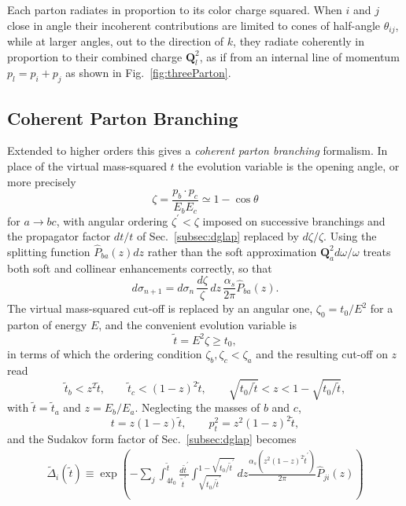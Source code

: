 Each parton radiates in proportion to its color charge squared. When \(i\) and \(j\) close in angle their incoherent
contributions are limited to cones of half-angle \(\theta_{ij}\), while at larger
angles, out to the direction of \(k\), they radiate coherently in proportion to
their combined charge \(\mathbf{Q}_l^2\), as if from an internal line of momentum
\(p_l = p_i+p_j\) as shown in Fig.~\ref{fig:threeParton}.

\subsection{Coherent Parton Branching}
\label{sec:coherentPartonBranching}
Extended to higher orders this gives a \emph{coherent parton branching} formalism.
In place of the virtual mass-squared \(t\) the evolution variable is the opening
angle, or more precisely
\begin{equation}
	\zeta = \frac{p_b\cdot p_c}{E_bE_c} \simeq 1-\cos\theta
	\label{eq:zeta}
\end{equation}
for \(a\to bc\), with angular ordering \(\zeta^\prime<\zeta\) imposed on successive
branchings and the propagator factor \(dt/t\) of Sec.~\ref{subsec:dglap} replaced by
\(d\zeta/\zeta\). Using the splitting function \(\hat{P}_{ba}(z)dz\) rather than the
soft approximation \(\mathbf{Q}_a^2d\omega/\omega\) treats both soft and collinear
enhancements correctly, so that
\begin{equation}
	d\sigma_{n+1} = d\sigma_n\,\frac{d\zeta}{\zeta}\,dz\,
	\frac{\alpha_s}{2\pi}\hat{P}_{ba}(z).
	\label{eq:coherentBranching}
\end{equation}
The virtual mass-squared cut-off is replaced by an angular one,
\(\zeta_0 = t_0/E^2\) for a parton of energy \(E\), and the convenient evolution
variable is
\begin{equation}
	\tilde{t} = E^2\zeta \geq t_0 ,
	\label{eq:tildeT}
\end{equation}
in terms of which the ordering condition \(\zeta_b,\zeta_c<\zeta_a\) and the
resulting cut-off on \(z\) read
\begin{equation}
	\tilde{t}_b < z^2\tilde{t},
	\qquad
	\tilde{t}_c < (1-z)^2\tilde{t},
	\qquad
	\sqrt{t_0/\tilde{t}} < z < 1-\sqrt{t_0/\tilde{t}} ,
	\label{eq:orderingCutoff}
\end{equation}
with \(\tilde{t}=\tilde{t}_a\) and \(z=E_b/E_a\). Neglecting the masses of \(b\) and
\(c\),
\begin{equation}
	t = z(1-z)\tilde{t},
	\qquad
	p_t^2 = z^2(1-z)^2\tilde{t},
	\label{eq:tAndPt}
\end{equation}
and the Sudakov form factor of Sec.~\ref{subsec:dglap} becomes
\begin{align}
	\tilde{\Delta}_i(\tilde{t}) \equiv \exp(-\sum_j\int_{4t_0}^{\tilde{t}}
	\frac{d\tilde{t}^\prime}{\tilde{t}^\prime}
	\int_{\sqrt{t_0/\tilde{t}^\prime}}^{1-\sqrt{t_0/\tilde{t}^\prime}} dz
	\frac{\alpha_s(z^2(1-z)^2\tilde{t}^\prime)}{2\pi} \hat{P}_{ji}(z))
	\label{eq:coherentSudakov}
\end{align}


